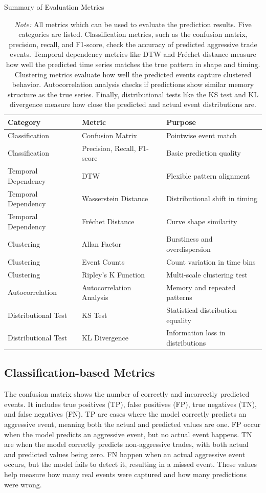\begin{table}[htbp]
\centering
\caption{Summary of Evaluation Metrics}
\caption*{\textit{Note:} All metrics which can be used to evaluate the prediction results. Five categories are listed. Classification metrics, such as the confusion matrix, precision, recall, and F1-score, check the accuracy of predicted aggressive trade events. Temporal dependency metrics like DTW and Fréchet distance measure how well the predicted time series matches the true pattern in shape and timing. Clustering metrics evaluate how well the predicted events capture clustered behavior. Autocorrelation analysis checks if predictions show similar memory structure as the true series. Finally, distributional tests like the KS test and KL divergence measure how close the predicted and actual event distributions are.}
\begin{tabular}{|l|l|l|}
\hline
\textbf{Category} & \textbf{Metric} & \textbf{Purpose} \\
\hline
Classification & Confusion Matrix & Pointwise event match \\
Classification & Precision, Recall, F1-score & Basic prediction quality \\
Temporal Dependency & DTW & Flexible pattern alignment \\
Temporal Dependency & Wasserstein Distance & Distributional shift in timing \\
Temporal Dependency & Fréchet Distance & Curve shape similarity \\
Clustering & Allan Factor & Burstiness and overdispersion \\
Clustering & Event Counts & Count variation in time bins \\
Clustering & Ripley's K Function & Multi-scale clustering test \\
Autocorrelation & Autocorrelation Analysis & Memory and repeated patterns \\
Distributional Test & KS Test & Statistical distribution equality \\
Distributional Test & KL Divergence & Information loss in distributions \\
\hline
\end{tabular}
\label{tb:Evaluation Metrics}
\end{table}

\subsection{Classification-based Metrics}
The confusion matrix shows the number of correctly and incorrectly predicted events. It includes true positives (TP), false positives (FP), true negatives (TN), and false negatives (FN). TP are cases where the model correctly predicts an aggressive event, meaning both the actual and predicted values are one. FP occur when the model predicts an aggressive event, but no actual event happens. TN are when the model correctly predicts non-aggressive trades, with both actual and predicted values being zero. FN happen when an actual aggressive event occurs, but the model fails to detect it, resulting in a missed event. These values help measure how many real events were captured and how many predictions were wrong.

